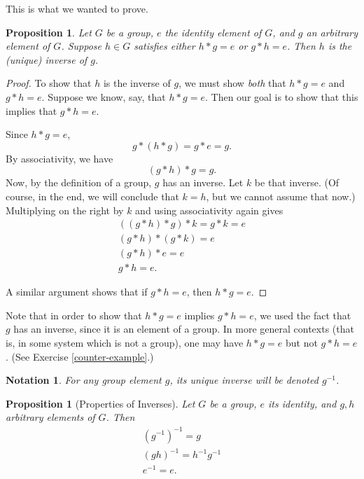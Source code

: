 \documentclass[12pt]{amsbook}
\theoremstyle{plain}
\newtheorem{notation}[theorem]{Notation}
\newtheorem{proposition}[theorem]{Proposition}
\numberwithin{equation}{chapter}
\numberwithin{theorem}{chapter}
\begin{document}
This is what we wanted to prove.

\begin{proposition}
\label{one-sided}Let $G$ be a group, $e$ the identity element of $G$, and $g$
an arbitrary element of $G$. Suppose $h\in G$ satisfies \textit{either} $h\ast
g=e$ or $g\ast h=e$. Then $h$ is the (unique) inverse of $g$.
\end{proposition}

\begin{proof}
To show that $h$ is the inverse of $g$, we must show \textit{both} that $h\ast
g=e$ and $g\ast h=e$. Suppose we know, say, that $h\ast g=e$. Then our goal is
to show that this implies that $g\ast h=e$.

Since $h\ast g=e$,
\[
g\ast(h\ast g)=g\ast e=g\text{.}%
\]
By associativity, we have
\[
(g\ast h)\ast g=g\text{.}%
\]
Now, by the definition of a group, $g$ has an inverse. Let $k$ be that
inverse. (Of course, in the end, we will conclude that $k=h$, but we cannot
assume that now.) Multiplying on the right by $k$ and using associativity
again gives
\begin{align*}
((g\ast h)\ast g)\ast k=g\ast k=e\\
(g\ast h)\ast(g\ast k)=e\\
(g\ast h)\ast e=e\\
g\ast h=e\text{.}%
\end{align*}

A similar argument shows that if $g\ast h=e$, then $h\ast g=e$.
\end{proof}

Note that in order to show that $h\ast g=e$ implies $g\ast h=e$, we used the
fact that $g$ has an inverse, since it is an element of a group. In more
general contexts (that is, in some system which is not a group), one may have
$h\ast g=e$ but not $g\ast h=e$. (See Exercise \ref{counter-example}.)

\begin{notation}
For any group element $g$, its unique inverse will be denoted $g^{-1}$.
\end{notation}

\begin{proposition}
[Properties of Inverses]\label{inverse.properties}Let $G$ be a group, $e$ its
identity, and $g,h$ arbitrary elements of $G$. Then
\begin{align*}
\left(  g^{-1}\right)  ^{-1}=g\\
\left(  gh\right)  ^{-1}=h^{-1}g^{-1}\\
e^{-1}=e\text{.}%
\end{align*}
\end{proposition}
\end{document}

